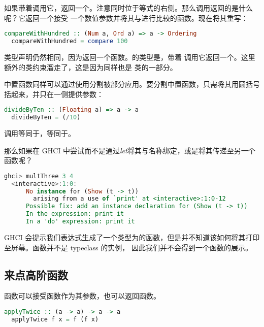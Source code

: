 \documentclass[./main.tex]{subfiles}
\begin{document}
如果带着调用它，返回一个。注意同时位于等式的右侧。那么调用返回的是什么呢？它返回一个接受
一个数值参数并将其与进行比较的函数。现在将其重写：

\begin{lstlisting}[language=Haskell]
  compareWithHundred :: (Num a, Ord a) => a -> Ordering
  compareWithHundred = compare 100
\end{lstlisting}

类型声明仍然相同，因为返回一个函数。的类型是，带着
调用它返回一个。这里额外的类约束溜走了，这是因为同样也是
类的一部分。

中置函数同样可以通过使用分割被部分应用。要分割中置函数，只需将其用圆括号括起来，并只在一侧提供参数：

\begin{lstlisting}[language=Haskell]
  divideByTen :: (Floating a) => a -> a
  divideByTen = (/10)
\end{lstlisting}

调用等同于，等同于。

那么如果在 GHCI 中尝试而不是通过\textit{let}将其与名称绑定，或是将其传递至另一个函数呢？

\begin{lstlisting}[language=Haskell]
  ghci> multThree 3 4
  <interactive>:1:0:
      No instance for (Show (t -> t))
        arising from a use of `print' at <interactive>:1:0-12
      Possible fix: add an instance declaration for (Show (t -> t))
      In the expression: print it
      In a 'do' expression: print it
\end{lstlisting}

GHCI 会提示我们表达式生成了一个类型为的函数，但是并不知道该如何将其打印至屏幕。函数并不是 typeclass 的实例，
因此我们并不会得到一个函数的展示。

\subsection*{来点高阶函数}

函数可以接受函数作为其参数，也可以返回函数。

\begin{lstlisting}[language=Haskell]
  applyTwice :: (a -> a) -> a -> a
  applyTwice f x = f (f x)
\end{lstlisting}
\end{document}
